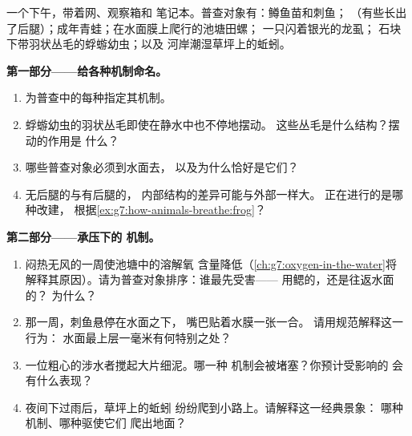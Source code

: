 \begin{problem}\label{pb:g7:how-animals-breathe:1}
一个下午，带着网、观察箱和
笔记本。普查对象有：鳟鱼苗和刺鱼；
（有些长出了后腿）；成年青蛙；在水面膜上爬行的池塘田螺；
一只闪着银光的龙虱；
石块下带羽状丛毛的蜉蝣幼虫；以及
河岸潮湿草坪上的蚯蚓。

\medskip\noindent\textbf{第一部分——给各种机制命名。}
\begin{enumerate}
  \item 为普查中的每种指定其机制。
  \item 蜉蝣幼虫的羽状丛毛即使在静水中也不停地摆动。
        这些丛毛是什么结构？摆动的作用是
        什么？
  \item 哪些普查对象必须到水面去，
        以及为什么恰好是它们？
  \item 无后腿的与有后腿的，
        内部结构的差异可能与外部一样大。
        正在进行的是哪种改建，
        根据\cref{ex:g7:how-animals-breathe:frog}？
\end{enumerate}

\medskip\noindent\textbf{第二部分——承压下的
机制。}
\begin{enumerate}[resume]
  \item 闷热无风的一周使池塘中的溶解氧
        含量降低（\cref{ch:g7:oxygen-in-the-water}将
        解释其原因）。请为普查对象排序：谁最先受害——
        用鳃的，还是往返水面的？
        为什么？
  \item 那一周，刺鱼悬停在水面之下，
        嘴巴贴着水膜一张一合。
        请用规范解释这一行为：
        水面最上层一毫米有何特别之处？
  \item 一位粗心的涉水者搅起大片细泥。哪一种
        机制会被堵塞？你预计受影响的
        会有什么表现？
  \item 夜间下过雨后，草坪上的蚯蚓
        纷纷爬到小路上。请解释这一经典景象：
        哪种机制、哪种驱使它们
        爬出地面？
\end{enumerate}


\end{problem}
